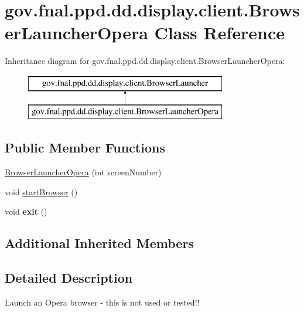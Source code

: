 \hypertarget{classgov_1_1fnal_1_1ppd_1_1dd_1_1display_1_1client_1_1BrowserLauncherOpera}{\section{gov.\-fnal.\-ppd.\-dd.\-display.\-client.\-Browser\-Launcher\-Opera Class Reference}
\label{classgov_1_1fnal_1_1ppd_1_1dd_1_1display_1_1client_1_1BrowserLauncherOpera}
}
Inheritance diagram for gov.\-fnal.\-ppd.\-dd.\-display.\-client.\-Browser\-Launcher\-Opera\-:\begin{figure}[H]
\begin{center}
\leavevmode
\includegraphics[height=2.000000cm]{classgov_1_1fnal_1_1ppd_1_1dd_1_1display_1_1client_1_1BrowserLauncherOpera}
\end{center}
\end{figure}
\subsection*{Public Member Functions}
\begin{DoxyCompactItemize}
\item 
\hyperlink{classgov_1_1fnal_1_1ppd_1_1dd_1_1display_1_1client_1_1BrowserLauncherOpera_a4d5e085b2c14aafd504333a444839f43}{Browser\-Launcher\-Opera} (int screen\-Number)
\item 
void \hyperlink{classgov_1_1fnal_1_1ppd_1_1dd_1_1display_1_1client_1_1BrowserLauncherOpera_ac2c658a2334bed5847aaeda60d7fe7b4}{start\-Browser} ()
\item 
\hypertarget{classgov_1_1fnal_1_1ppd_1_1dd_1_1display_1_1client_1_1BrowserLauncherOpera_ae8825a3ef614dbe22dff39adb9e4f50b}{void {\bfseries exit} ()}\label{classgov_1_1fnal_1_1ppd_1_1dd_1_1display_1_1client_1_1BrowserLauncherOpera_ae8825a3ef614dbe22dff39adb9e4f50b}

\end{DoxyCompactItemize}
\subsection*{Additional Inherited Members}


\subsection{Detailed Description}
Launch an Opera browser -\/ this is not used or tested!!

